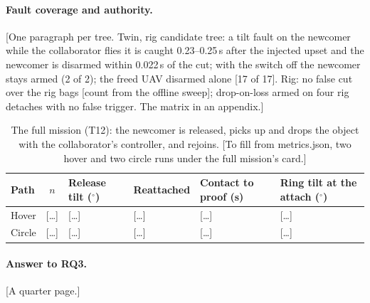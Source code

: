 
\paragraph{Fault coverage and authority.} [One paragraph per tree. Twin, rig candidate tree: a tilt fault on the
newcomer while the collaborator flies it is caught 0.23--0.25\,s after the injected upset and the newcomer is
disarmed within 0.022\,s of the cut; with the switch off the newcomer stays armed (2 of 2); the freed UAV disarmed
alone [17 of 17]. Rig: no false cut over the rig bags [count from the offline sweep]; drop-on-loss armed on four rig
detaches with no false trigger. The matrix in an appendix.]

\begin{table}[htbp]
  \centering
  \footnotesize
  \caption{The full mission (T12): the newcomer is released, picks up and drops the object with the collaborator's
  controller, and rejoins. [To fill from metrics.json, two hover and two circle runs under the full mission's card.]}
  \label{tab:T12}
  \begin{tabularx}{\textwidth}{lcYYYY}
    \toprule
    Path & $n$ & Release tilt ($^\circ$) & Reattached & Contact to proof (s) & Ring tilt at the attach ($^\circ$) \\
    \midrule
    Hover & [\dots] & [\dots] & [\dots] & [\dots] & [\dots] \\
    Circle & [\dots] & [\dots] & [\dots] & [\dots] & [\dots] \\
    \bottomrule
  \end{tabularx}
\end{table}

\paragraph{Answer to RQ3.} [A quarter page.]

